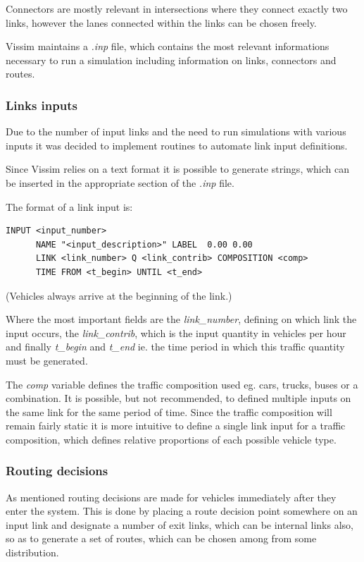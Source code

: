 Connectors are mostly relevant in intersections where they connect exactly two links, however the lanes connected within the links can be chosen freely.

Vissim maintains a \textit{.inp} file, which contains the most relevant informations necessary to run a simulation including information on links, connectors and routes. 

\subsubsection{Links inputs}
Due to the number of input links and the need to run simulations with various inputs it was decided to implement routines to automate link input definitions.

Since Vissim relies on a text format it is possible to generate strings, which can be inserted in the appropriate section of the \textit{.inp} file.

The format of a link input is:
\begin{verbatim}
INPUT <input_number>
      NAME "<input_description>" LABEL  0.00 0.00
      LINK <link_number> Q <link_contrib> COMPOSITION <comp>
      TIME FROM <t_begin> UNTIL <t_end>
\end{verbatim}

(Vehicles always arrive at the beginning of the link.)

Where the most important fields are the \textit{link\_number}, defining on which link the input occurs, the \textit{link\_contrib}, which is the input quantity in vehicles per hour and finally \textit{t\_begin} and \textit{t\_end} ie. the time period in which this traffic quantity must be generated.

The \textit{comp} variable defines the traffic composition used eg. cars, trucks, buses or a combination. It is possible, but not recommended, to defined multiple inputs on the same link for the same period of time. Since the traffic composition will remain fairly static it is more intuitive to define a single link input for a traffic composition, which defines relative proportions of each possible vehicle type.

\subsubsection{Routing decisions}
\label{routingdecisions}
As mentioned routing decisions are made for vehicles immediately after they enter the system. This is done by placing a route decision point somewhere on an input link and designate a number of exit links, which can be internal links also, so as to generate a set of routes, which can be chosen among from some distribution.

